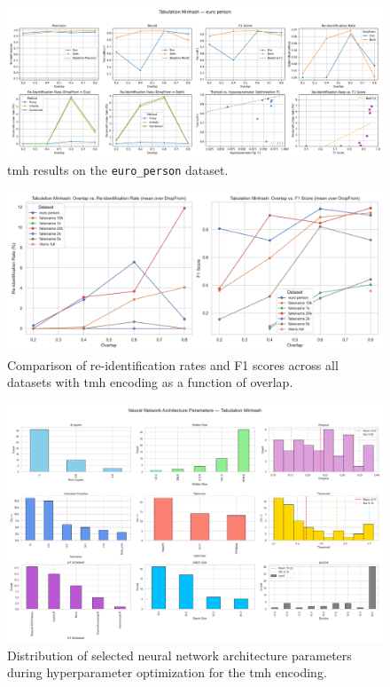 \begin{figure}[H]
    \centering
    \includegraphics[width=\textwidth]{figures/TabMinHash_euro_person_metrics.png}
    \caption{\ac{tmh} results on the \texttt{euro\_person} dataset.}
    \label{fig:tabminhash_euro}
\end{figure}

\begin{figure}[H]
    \centering
    \includegraphics[width=\textwidth]{figures/TabMinHash_overlap_summary.png}
    \caption{Comparison of re-identification rates and F1 scores across all datasets with \ac{tmh} encoding as a function of overlap.}
    \label{fig:tabminhash_overlap}
\end{figure}

\begin{figure}[H]
    \centering
    \includegraphics[width=\textwidth]{figures/TabMinHash_architecture.png}
    \caption{Distribution of selected neural network architecture parameters during hyperparameter optimization for the \ac{tmh} encoding.}
    \label{fig:tabminhash_architecture}
\end{figure}

